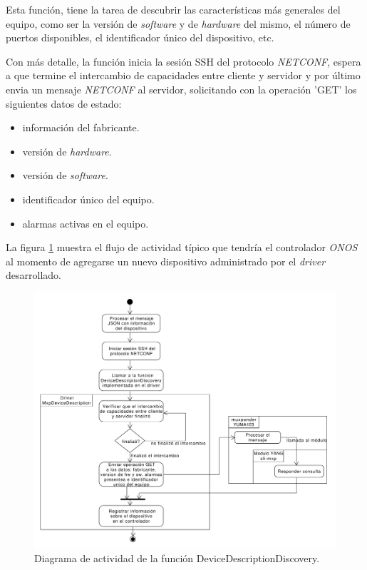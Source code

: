     Esta función, tiene la tarea de descubrir las características más generales del equipo, como ser la versión de \textit{software} y de \textit{hardware} del mismo, el número de puertos disponibles, el identificador único del dispositivo, etc.

    Con más detalle, la función inicia la sesión SSH del protocolo \textit{NETCONF}, espera a que termine el intercambio de capacidades entre cliente y servidor y por último envia un mensaje \textit{NETCONF} al servidor, solicitando con la operación 'GET' los siguientes datos de estado:  
    
    \begin{itemize}
        \item información del fabricante.
        \item versión de \textit{hardware}.
        \item versión de \textit{software}.
        \item identificador único del equipo.
        \item alarmas activas en el equipo.
    \end{itemize}


    La figura \ref{fig:actividad_driver_descr} muestra el flujo de actividad típico que tendría el controlador \textit{ONOS} al momento de agregarse un nuevo dispositivo administrado por el \textit{driver} desarrollado.
    
    \begin{figure}[H]
        \centering
        \includegraphics[scale=0.45]{Figures/actividad_driver_descr.pdf}
        \caption{Diagrama de actividad de la función DeviceDescriptionDiscovery.}
        \label{fig:actividad_driver_descr}
      \end{figure}

